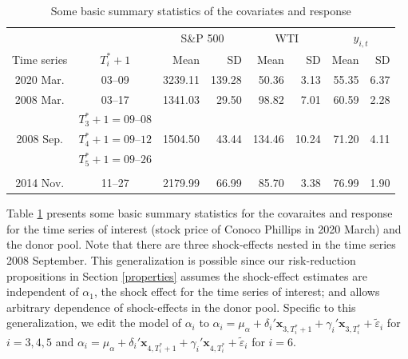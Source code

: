 \documentclass[11pt]{article}
\theoremstyle{definition}
\begin{document}

\vspace{-.3cm}
\begin{table}[H]
  \caption{Some basic summary statistics of the covariates and response} \vspace{.4cm} \label{table1}
  \begin{center}
    \begin{tabular}{ccrrrrrr}
       &    & \multicolumn{2}{c}{S\&P 500} & \multicolumn{2}{c}{WTI}  & \multicolumn{2}{c}{$y_{i,t}$} \\
     Time series & $T_i^*+1$ & Mean & SD  &  Mean & SD  & Mean & SD  \\
             \hline 
2020 Mar.  &  03--09 & 3239.11 & 139.28 & 50.36 & 3.13 & 55.35 & 6.37 \\ 
  2008 Mar.  & 03--17 & 1341.03 & 29.50 & 98.82 & 7.01 & 60.59 & 2.28 \\ 
 \multirow{3}{*}{2008 Sep.}
 & $T_3^* +1 = \text{09--08}$ & \multirow{3}{*}{1504.50}  & \multirow{3}{*}{43.44}  & \multirow{3}{*}{134.46} & \multirow{3}{*}{10.24} & \multirow{3}{*}{71.20}  & \multirow{3}{*}{4.11}  \\ 
 & $T_4^* +1 = \text{09--12}$ \\
   & $T_5^* +1 = \text{09--26}$ \\
\\
  2014 Nov.  & 11--27 & 2179.99 & 66.99 & 85.70 & 3.38 & 76.99 & 1.90 \\ 
    \end{tabular}
  \end{center}  \vspace{-.3cm}
\end{table}


Table \ref{table1} presents some basic summary statistics for the covaraites and response for the time series of interest (stock price of Conoco Phillips in 2020 March) and the donor pool. Note that there are three shock-effects nested in the time series 2008 September. This generalization is possible since our risk-reduction propositions in Section \ref{properties} assumes the shock-effect estimates are independent of $\alpha_1$, the shock effect for the time series of interest; and allows arbitrary dependence of shock-effects in the donor pool. Specific to this generalization, we edit the model of $\alpha_i$ to $\alpha_i = \mu_{\alpha} + \delta_i'\mathbf{x}_{3, T_i^* + 1} + \gamma_i'\mathbf{x}_{3, T_i^*} + \tilde{\varepsilon}_i$ for $i = 3, 4, 5$ and $\alpha_i = \mu_{\alpha} + \delta_i'\mathbf{x}_{4, T_i^* + 1} + \gamma_i'\mathbf{x}_{4, T_i^*} + \tilde{\varepsilon}_i$ for $i = 6$.
\end{document}
